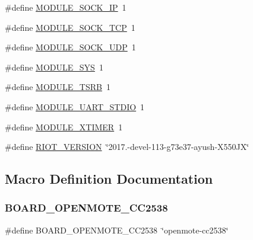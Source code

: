 \begin{DoxyCompactItemize}
\item 
\#define \hyperlink{openmote-cc2538_2riotbuild_2riotbuild_8h_af20092e67de1f042e719481a3da1428d}{M\+O\+D\+U\+L\+E\+\_\+\+S\+O\+C\+K\+\_\+\+IP}~1
\item 
\#define \hyperlink{openmote-cc2538_2riotbuild_2riotbuild_8h_aba99e3eba38384fb085a03712653533c}{M\+O\+D\+U\+L\+E\+\_\+\+S\+O\+C\+K\+\_\+\+T\+CP}~1
\item 
\#define \hyperlink{openmote-cc2538_2riotbuild_2riotbuild_8h_af6288ebc28cfd9beef3d412ccdd5cc50}{M\+O\+D\+U\+L\+E\+\_\+\+S\+O\+C\+K\+\_\+\+U\+DP}~1
\item 
\#define \hyperlink{openmote-cc2538_2riotbuild_2riotbuild_8h_a44c0dcd9afa5fb7b197b70e2ec1b17b1}{M\+O\+D\+U\+L\+E\+\_\+\+S\+YS}~1
\item 
\#define \hyperlink{openmote-cc2538_2riotbuild_2riotbuild_8h_a53e7c13bd96e433c994e34cb676e77f4}{M\+O\+D\+U\+L\+E\+\_\+\+T\+S\+RB}~1
\item 
\#define \hyperlink{openmote-cc2538_2riotbuild_2riotbuild_8h_a2ca3235d9cff83fd6d22234cf2a7dc94}{M\+O\+D\+U\+L\+E\+\_\+\+U\+A\+R\+T\+\_\+\+S\+T\+D\+IO}~1
\item 
\#define \hyperlink{openmote-cc2538_2riotbuild_2riotbuild_8h_a0650faa313707c3a55453d721bdf4c56}{M\+O\+D\+U\+L\+E\+\_\+\+X\+T\+I\+M\+ER}~1
\item 
\#define \hyperlink{openmote-cc2538_2riotbuild_2riotbuild_8h_a4e095a4668ff041ffb1e577f3a4c444c}{R\+I\+O\+T\+\_\+\+V\+E\+R\+S\+I\+ON}~\char`\"{}2017.-\/devel-\/113-\/g73e37-\/ayush-\/X550\+JX\char`\"{}
\end{DoxyCompactItemize}


\subsection{Macro Definition Documentation}
\mbox{\label{openmote-cc2538_2riotbuild_2riotbuild_8h_a130c07be864b409634e44cd734273a7a}} 
\subsubsection{\texorpdfstring{B\+O\+A\+R\+D\+\_\+\+O\+P\+E\+N\+M\+O\+T\+E\+\_\+\+C\+C2538}{BOARD\_OPENMOTE\_CC2538}}
{\footnotesize\ttfamily \#define B\+O\+A\+R\+D\+\_\+\+O\+P\+E\+N\+M\+O\+T\+E\+\_\+\+C\+C2538~\char`\"{}openmote-\/cc2538\char`\"{}}

